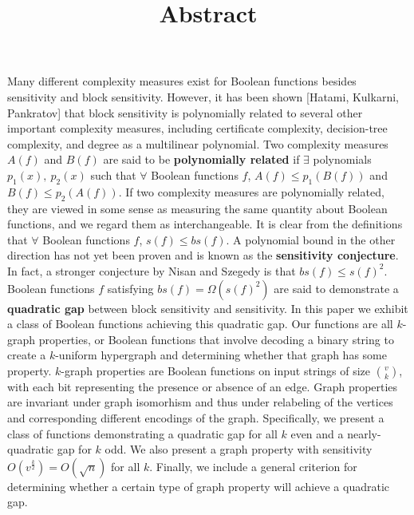 \documentclass[psamsfonts]{amsart}
\title{Abstract}
\theoremstyle{definition}
\theoremstyle{remark}
\numberwithin{equation}{section}
\begin{document}
\maketitle

Many different complexity measures exist for Boolean functions besides sensitivity and block sensitivity.  However, it has been shown [Hatami, Kulkarni, Pankratov] that block sensitivity 
is polynomially related to several other important complexity measures, including certificate complexity, decision-tree complexity, and degree as a multilinear polynomial.  
Two complexity measures $A(f)$ and $B(f)$ are said to be \textbf{polynomially related} if $\exists$ polynomials $ p_{1}(x),  \: p_{2}(x) $ such that $\forall$ Boolean functions $f$, 
$A(f) \leq p_{1}(B(f))$ and $B(f) \leq p_{2}(A(f))$.  
If two complexity measures are polynomially related, they are viewed in some sense as measuring the same quantity about Boolean functions, and we regard them as interchangeable.  
It is clear from the definitions that $\forall$ Boolean functions $f$, $s(f) \leq bs(f)$.  A polynomial bound in the other direction has not yet been proven and is known as the 
\textbf{sensitivity conjecture}.  In fact, a stronger conjecture by Nisan and Szegedy is that $bs(f) \leq s(f)^{2}$.  Boolean functions $f$ satisfying $bs(f) = \Omega(s(f)^{2})$ are said to 
demonstrate a \textbf{quadratic gap} between block sensitivity and sensitivity.  In this paper we exhibit a class of Boolean functions achieving this 
quadratic gap.  Our functions are all $k$-graph properties, or Boolean functions that involve decoding a binary string to create a 
$k$-uniform hypergraph
and determining whether that graph has some property.  $k$-graph properties are Boolean functions on input strings of size ${v \choose k}$, with each bit representing the presence or 
absence of an edge.  Graph properties are invariant under graph isomorhism and thus under relabeling of the vertices and corresponding different encodings of the graph.  Specifically, we present a class of functions demonstrating a quadratic gap for all $k$ even and a nearly-quadratic gap for $k$ odd.  We also present a graph property with 
sensitivity $O(v^{\frac{k}{2}})=O(\sqrt n)$ for all $k$.  
Finally, we include a general criterion for determining whether a certain type of graph property will achieve a quadratic gap.  
\end{document}
